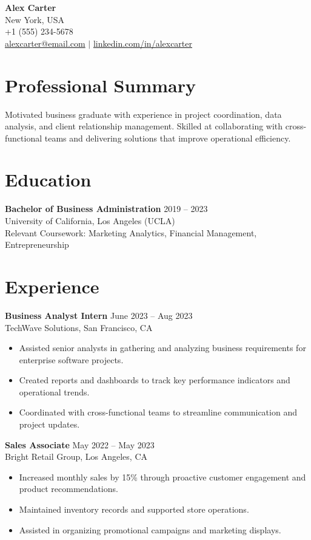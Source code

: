 \documentclass[letterpaper,11pt]{article}
\begin{document}
\begin{center}
    {\LARGE \textbf{Alex Carter}} \\[4pt]
    New York, USA \\ 
    +1 (555) 234-5678 \\
    \href{mailto:alexcarter@email.com}{alexcarter@email.com} $|$
    \href{https://linkedin.com/in/alexcarter}{linkedin.com/in/alexcarter}
\end{center}

\section*{Professional Summary}
Motivated business graduate with experience in project coordination, data analysis, and client relationship management. Skilled at collaborating with cross-functional teams and delivering solutions that improve operational efficiency.

\section*{Education}
\textbf{Bachelor of Business Administration} \hfill 2019 -- 2023 \\
University of California, Los Angeles (UCLA) \\
Relevant Coursework: Marketing Analytics, Financial Management, Entrepreneurship

\section*{Experience}

\textbf{Business Analyst Intern} \hfill June 2023 -- Aug 2023 \\
TechWave Solutions, San Francisco, CA
\begin{itemize}[leftmargin=*]
\item Assisted senior analysts in gathering and analyzing business requirements for enterprise software projects.
\item Created reports and dashboards to track key performance indicators and operational trends.
\item Coordinated with cross-functional teams to streamline communication and project updates.
\end{itemize}

\textbf{Sales Associate} \hfill May 2022 -- May 2023 \\
Bright Retail Group, Los Angeles, CA
\begin{itemize}[leftmargin=*]
\item Increased monthly sales by 15\% through proactive customer engagement and product recommendations.
\item Maintained inventory records and supported store operations.
\item Assisted in organizing promotional campaigns and marketing displays.
\end{itemize}
\end{document}
